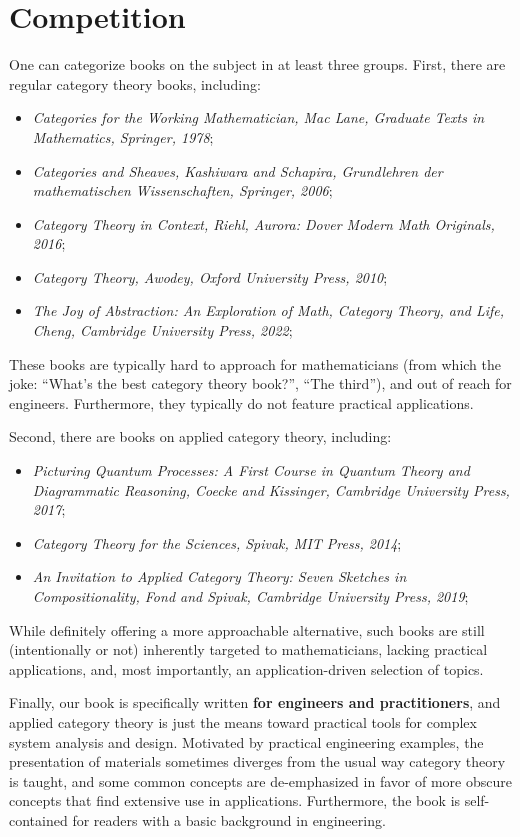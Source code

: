 \documentclass[10pt, article, one side]{memoir}
\begin{document}
    \section{Competition}
    One can categorize books on the subject in at least three groups.
    First, there are regular category theory books, including:
    \begin{itemize}
        \item \emph{Categories for the Working Mathematician, Mac Lane, Graduate Texts in Mathematics, Springer, 1978};
        \item \emph{Categories and Sheaves, Kashiwara and Schapira, Grundlehren der mathematischen Wissenschaften, Springer, 2006};
        \item \emph{Category Theory in Context, Riehl, Aurora: Dover Modern Math Originals, 2016};
        \item \emph{Category Theory, Awodey, Oxford University Press, 2010};
        \item \emph{The Joy of Abstraction: An Exploration of Math, Category Theory, and Life, Cheng, Cambridge University Press, 2022};
    \end{itemize}
    These books are typically hard to approach for mathematicians (from which the joke: “What’s the best category theory book?”, “The third”), and out of reach for engineers.
    Furthermore, they typically do not feature practical applications.

    Second, there are books on applied category theory, including:
    \begin{itemize}
        \item \emph{Picturing Quantum Processes: A First Course in Quantum Theory and Diagrammatic Reasoning, Coecke and Kissinger, Cambridge University Press, 2017};
        \item \emph{Category Theory for the Sciences, Spivak, MIT Press, 2014};
        \item \emph{An Invitation to Applied Category Theory: Seven Sketches in Compositionality, Fond and Spivak, Cambridge University Press, 2019};
    \end{itemize}

    While definitely offering a more approachable alternative, such books are still (intentionally or not) inherently targeted to mathematicians, lacking practical applications, and, most importantly, an application-driven selection of topics.

    Finally, our book is specifically written \textbf{for engineers and practitioners}, and applied category theory is just the means toward practical tools for complex system analysis and design.
    Motivated by practical engineering examples, the presentation of materials sometimes diverges from the usual way category theory is taught, and some common concepts are de-emphasized in favor of more obscure concepts that find extensive use in applications.
    Furthermore, the book is self-contained for readers with a basic background in engineering.
\end{document}
